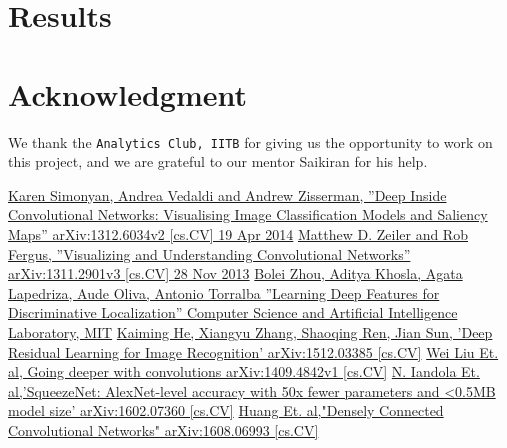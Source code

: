 \documentclass[conference]{IEEEtran}
\begin{document}
\section{Results}



\section*{Acknowledgment}

We thank the \texttt{Analytics Club, IITB} for giving us the opportunity to work on this project, and we are grateful to our mentor Saikiran for his help.

\begin{thebibliography}{00}
 \href{https://arxiv.org/pdf/1312.6034.pdf}{Karen Simonyan, Andrea Vedaldi and Andrew Zisserman, ''Deep Inside Convolutional Networks: Visualising
Image Classification Models and Saliency Maps'' arXiv:1312.6034v2 [cs.CV] 19 Apr 2014}
 \href{https://arxiv.org/pdf/1311.2901.pdf}{Matthew D. Zeiler and Rob Fergus, ''Visualizing and Understanding Convolutional Networks'' arXiv:1311.2901v3 [cs.CV] 28 Nov 2013}
 \href{http://cnnlocalization.csail.mit.edu/Zhou_Learning_Deep_Features_CVPR_2016_paper.pdf}{Bolei Zhou, Aditya Khosla, Agata Lapedriza, Aude Oliva, Antonio Torralba ''Learning Deep Features for Discriminative Localization'' Computer Science and Artificial Intelligence Laboratory, MIT}
 \href{https://arxiv.org/pdf/1512.03385.pdf}{Kaiming He, Xiangyu Zhang, Shaoqing Ren, Jian Sun, 'Deep Residual Learning for Image Recognition' arXiv:1512.03385 [cs.CV]}
 \href{https://arxiv.org/pdf/1409.4842.pdf}{Wei Liu Et. al, Going deeper with convolutions arXiv:1409.4842v1 [cs.CV]}
 \href{https://arxiv.org/pdf/1602.07360.pdf}{N. Iandola Et. al,'SqueezeNet: AlexNet-level accuracy with 50x fewer parameters and <0.5MB model size'	arXiv:1602.07360 [cs.CV]}
 \href{https://arxiv.org/pdf/1608.06993.pdf}{Huang Et. al,"Densely Connected Convolutional Networks" arXiv:1608.06993 [cs.CV]}
\end{thebibliography}
\end{document}
